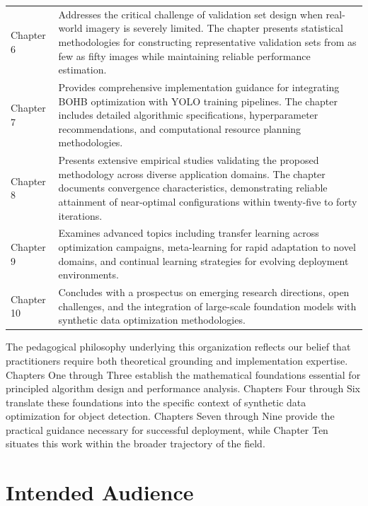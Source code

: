 \begin{table}[h]
\begin{tabular}{p{}p{}}
\addlinespace
Chapter 6 & Addresses the critical challenge of validation set design when real-world imagery is severely limited. The chapter presents statistical methodologies for constructing representative validation sets from as few as fifty images while maintaining reliable performance estimation. \\
\addlinespace
Chapter 7 & Provides comprehensive implementation guidance for integrating BOHB optimization with YOLO training pipelines. The chapter includes detailed algorithmic specifications, hyperparameter recommendations, and computational resource planning methodologies. \\
\addlinespace
Chapter 8 & Presents extensive empirical studies validating the proposed methodology across diverse application domains. The chapter documents convergence characteristics, demonstrating reliable attainment of near-optimal configurations within twenty-five to forty iterations. \\
\addlinespace
Chapter 9 & Examines advanced topics including transfer learning across optimization campaigns, meta-learning for rapid adaptation to novel domains, and continual learning strategies for evolving deployment environments. \\
\addlinespace
Chapter 10 & Concludes with a prospectus on emerging research directions, open challenges, and the integration of large-scale foundation models with synthetic data optimization methodologies. \\
\bottomrule
\end{tabular}
\end{table}

The pedagogical philosophy underlying this organization reflects our belief that practitioners require both theoretical grounding and implementation expertise. Chapters One through Three establish the mathematical foundations essential for principled algorithm design and performance analysis. Chapters Four through Six translate these foundations into the specific context of synthetic data optimization for object detection. Chapters Seven through Nine provide the practical guidance necessary for successful deployment, while Chapter Ten situates this work within the broader trajectory of the field.

\section*{Intended Audience}


